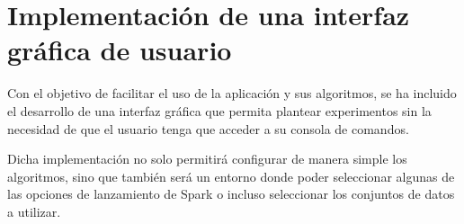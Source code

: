 \section{Implementación de una interfaz gráfica de usuario}

Con el objetivo de facilitar el uso de la aplicación y sus algoritmos, se ha incluido el desarrollo de una interfaz gráfica que permita plantear experimentos sin la necesidad de que el usuario tenga que acceder a su consola de comandos.

Dicha implementación no solo permitirá configurar de manera simple los algoritmos, sino que también será un entorno donde poder seleccionar algunas de las opciones de lanzamiento de Spark o incluso seleccionar los conjuntos de datos a utilizar.


